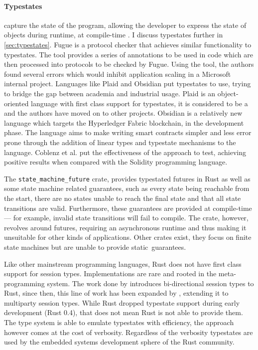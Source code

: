 \paragraph{Typestates} capture the state of the program,
allowing the developer to express the state of objects during runtime, at compile-time \autocite{Strom1983, Strom1986}.
I discuss typestates further in \autoref{sec:typestates}.
Fugue \autocite{DeLine2004} is a protocol checker that achieves similar functionality to typestates.
The tool provides a series of annotations to be used in code which are then processed into protocols to be checked by Fugue.
Using the tool, the authors found several errors which would inhibit application scaling in a Microsoft internal project.
Languages like Plaid \autocite{Aldrich2009} and Obsidian \autocite{Coblenz2020, Coblenz2020a} put typestates to use,
trying to bridge the gap between academia and industrial usage.
Plaid is an object-oriented language with first class support for typestates,
it is considered to be a  and the authors have moved on to other projects.
Obsidian is a relatively new language which targets the Hyperledger Fabric blockchain, in the development phase.
The language aims to make writing smart contracts simpler and less error prone
through the addition of linear types and typestate mechanisms to the language.
Coblenz et al. \autocite{Coblenz2020} put the effectiveness of the approach to test,
achieving positive results when compared with the Solidity programming language.

The \texttt{state\_machine\_future} crate, provides typestated futures in Rust as well as some state machine related guarantees,
such as every state being reachable from the start,
there are no states unable to reach the final state and that all state transitions are valid.
Furthermore, these guarantees are provided at compile-time --- for example, invalid state transitions will fail to compile.
The crate, however, revolves around futures, requiring an asynchronous runtime and thus making it unsuitable for other kinds of applications.
Other crates exist, they focus on finite state machines but are unable to provide static~guarantees.

Like other mainstream programming languages, Rust does not have first class support for session types.
Implementations are rare and rooted in the meta-programming system.
The work done by \autocite{Jespersen2015} introduces bi-directional session types to Rust,
since then, this line of work has been expanded by \autocite{Lagaillardie2020}, extending it to multiparty session types.
While Rust dropped typestate support during early development (Rust 0.4), that does not mean Rust is not able to provide them.
The type system is able to emulate typestates with efficiency, the approach however comes at the cost of verbosity.
Regardless of the verbosity typestates are used by the embedded systems development sphere of the Rust community.

